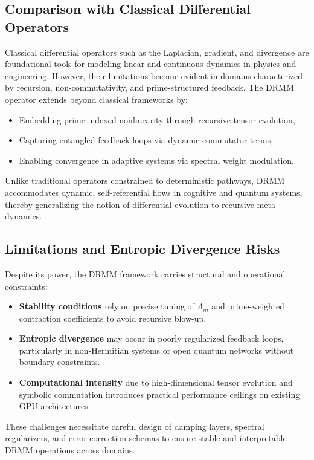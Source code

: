 \documentclass{article}
\theoremstyle{plain}
\begin{document}
\subsection{Comparison with Classical Differential Operators}

Classical differential operators such as the Laplacian, gradient, and divergence are foundational tools for modeling linear and continuous dynamics in physics and engineering. However, their limitations become evident in domains characterized by recursion, non-commutativity, and prime-structured feedback. The DRMM operator extends beyond classical frameworks by:
\begin{itemize}
    \item Embedding prime-indexed nonlinearity through recursive tensor evolution,
    \item Capturing entangled feedback loops via dynamic commutator terms,
    \item Enabling convergence in adaptive systems via spectral weight modulation.
\end{itemize}
Unlike traditional operators constrained to deterministic pathways, DRMM accommodates dynamic, self-referential flows in cognitive and quantum systems, thereby generalizing the notion of differential evolution to recursive meta-dynamics.

\subsection{Limitations and Entropic Divergence Risks}

Despite its power, the DRMM framework carries structural and operational constraints:
\begin{itemize}
    \item \textbf{Stability conditions} rely on precise tuning of $\Lambda_m$ and prime-weighted contraction coefficients to avoid recursive blow-up.
    \item \textbf{Entropic divergence} may occur in poorly regularized feedback loops, particularly in non-Hermitian systems or open quantum networks without boundary constraints.
    \item \textbf{Computational intensity} due to high-dimensional tensor evolution and symbolic commutation introduces practical performance ceilings on existing GPU architectures.
\end{itemize}
These challenges necessitate careful design of damping layers, spectral regularizers, and error correction schemas to ensure stable and interpretable DRMM operations across domains.
\end{document}
